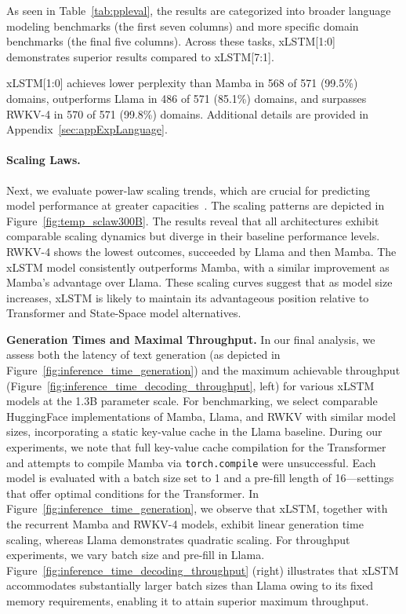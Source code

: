 As seen in Table~\ref{tab:ppleval}, the results are categorized into broader language modeling benchmarks (the first seven columns) and more specific domain benchmarks (the final five columns). Across these tasks, xLSTM[1:0] demonstrates superior results compared to xLSTM[7:1].

xLSTM[1:0] achieves lower perplexity than Mamba in 568 of 571 (99.5\%) domains, outperforms Llama in 486 of 571 (85.1\%) domains, and surpasses RWKV-4 in 570 of 571 (99.8\%) domains. Additional details are provided in Appendix~\ref{sec:appExpLanguage}.

\paragraph{Scaling Laws.} Next, we evaluate power-law scaling trends, which are crucial for predicting model performance at greater capacities~\citep{Kaplan:20,Brown:20short}. The scaling patterns are depicted in Figure~\ref{fig:temp_sclaw300B}. The results reveal that all architectures exhibit comparable scaling dynamics but diverge in their baseline performance levels. RWKV-4 shows the lowest outcomes, succeeded by Llama and then Mamba. The xLSTM model consistently outperforms Mamba, with a similar improvement as Mamba’s advantage over Llama. These scaling curves suggest that as model size increases, xLSTM is likely to maintain its advantageous position relative to Transformer and State-Space model alternatives.

\textbf{Generation Times and Maximal Throughput.} In our final analysis, we assess both the latency of text generation (as depicted in Figure~\ref{fig:inference_time_generation}) and the maximum achievable throughput (Figure~\ref{fig:inference_time_decoding_throughput}, left) for various xLSTM models at the 1.3B parameter scale. For benchmarking, we select comparable HuggingFace implementations of Mamba, Llama, and RWKV with similar model sizes, incorporating a static key-value cache in the Llama baseline. During our experiments, we note that full key-value cache compilation for the Transformer and attempts to compile Mamba via \texttt{torch.compile} were unsuccessful. Each model is evaluated with a batch size set to 1 and a pre-fill length of 16—settings that offer optimal conditions for the Transformer. In Figure~\ref{fig:inference_time_generation}, we observe that xLSTM, together with the recurrent Mamba and RWKV-4 models, exhibit linear generation time scaling, whereas Llama demonstrates quadratic scaling. For throughput experiments, we vary batch size and pre-fill in Llama. Figure~\ref{fig:inference_time_decoding_throughput} (right) illustrates that xLSTM accommodates substantially larger batch sizes than Llama owing to its fixed memory requirements, enabling it to attain superior maximum throughput.

